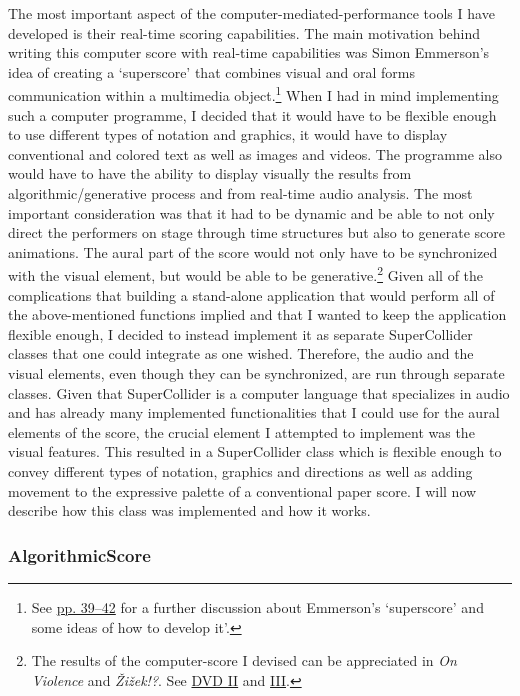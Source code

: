 The most important aspect of the computer-mediated-performance tools I have developed is their real-time scoring capabilities. The main motivation behind writing this computer score with real-time capabilities was Simon Emmerson's idea of creating a `superscore' that combines visual and oral forms communication within a multimedia object.\footnote{See \hyperlink{superscore}{pp. 39--42} for a further discussion about Emmerson's `superscore' and some ideas of how to develop it'.} When I had in mind implementing such a computer programme, I decided that it would have to be flexible enough to use different types of notation and graphics, it would have to display conventional and colored text as well as images and videos. The programme also would have to have the ability to display visually the results from algorithmic/generative process and from real-time audio analysis. The most important consideration was that it had to be dynamic and be able to not only direct the performers on stage through time structures but also to generate score animations. The aural part of the score would not only have to be synchronized with the visual element, but would be able to be generative.\footnote{The results of the computer-score I devised can be appreciated in \emph{On Violence} and \emph{\v{Z}i\v{z}ek!?}. See \href{http://phd.federicoreuben.com/onviolence/}{DVD II} and \href{http://phd.federicoreuben.com/zizek/}{III}.} Given all of the complications that building a stand-alone application that would perform all of the above-mentioned functions implied and that I wanted to keep the application flexible enough, I decided to instead implement it as separate SuperCollider classes that one could integrate as one wished. Therefore, the audio and the visual elements, even though they can be synchronized, are run through separate classes. Given that SuperCollider is a computer language that specializes in audio and has already many implemented functionalities that I could use for the aural elements of the score, the crucial element I attempted to implement was the visual features. This resulted in a SuperCollider class which is flexible enough to convey different types of notation, graphics and directions as well as adding movement to the expressive palette of a conventional paper score. I will now describe how this class was implemented and how it works.

\hypertarget{algoscore}{}
\subsubsection{AlgorithmicScore}

